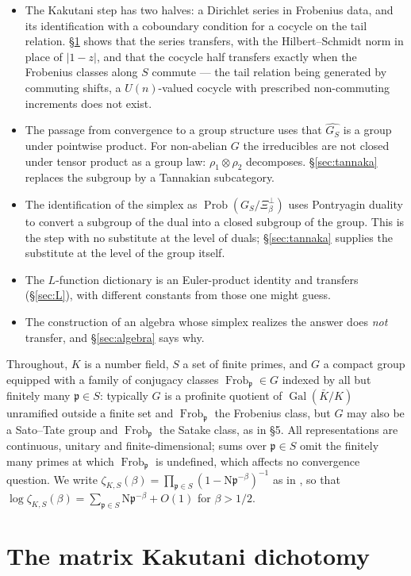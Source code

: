 \documentclass[11pt]{amsart}
\numberwithin{equation}{section}
\theoremstyle{definition}
\theoremstyle{remark}
\newcommand{\pp}{\mathfrak{p}}
\newcommand{\Ns}{\mathrm{N}}
\newcommand{\Frob}{\operatorname{Frob}}
\newcommand{\Gal}{\operatorname{Gal}}
\newcommand{\Prob}{\operatorname{Prob}}
\begin{document}
\begin{itemize}
\item[(i)] The Kakutani step has two halves: a Dirichlet series in Frobenius data, and its
identification with a coboundary condition for a cocycle on the tail relation.
\S\ref{sec:kakutani} shows that the series transfers, with the Hilbert--Schmidt norm in
place of $|1-z|$, and that the cocycle half transfers exactly when the Frobenius classes
along $S$ commute --- the tail relation being generated by commuting shifts, a
$U(n)$-valued cocycle with prescribed non-commuting increments does not exist.
\item[(ii)] The passage from convergence to a group structure uses that $\widehat{G_S}$ is a
group under pointwise product. For non-abelian $G$ the irreducibles are not closed under
tensor product as a group law: $\rho_1\otimes\rho_2$ decomposes. \S\ref{sec:tannaka} replaces
the subgroup by a Tannakian subcategory.
\item[(iii)] The identification of the simplex as $\Prob(G_S/\Xi_\beta^\perp)$ uses
Pontryagin duality to convert a subgroup of the dual into a closed subgroup of the group.
This is the step with no substitute at the level of duals; \S\ref{sec:tannaka} supplies the
substitute at the level of the group itself.
\item[(iv)] The $L$-function dictionary is an Euler-product identity and transfers
(\S\ref{sec:L}), with different constants from those one might guess.
\item[(v)] The construction of an algebra whose simplex realizes the answer does \emph{not}
transfer, and \S\ref{sec:algebra} says why.
\end{itemize}

Throughout, $K$ is a number field, $S$ a set of finite primes, and $G$ a compact group
equipped with a family of conjugacy classes $\Frob_\pp\in G$ indexed by all but finitely
many $\pp\in S$: typically $G$ is a profinite quotient of $\Gal(\bar K/K)$ unramified outside
a finite set and $\Frob_\pp$ the Frobenius class, but $G$ may also be a Sato--Tate group and
$\Frob_\pp$ the Satake class, as in \S5. All representations are continuous, unitary and
finite-dimensional; sums over $\pp\in S$ omit the finitely many primes at which
$\Frob_\pp$ is undefined, which affects no convergence question. We write
$\zeta_{K,S}(\beta)=\prod_{\pp\in S}(1-\Ns\pp^{-\beta})^{-1}$ as in \cite{Main}, so that
$\log\zeta_{K,S}(\beta)=\sum_{\pp\in S}\Ns\pp^{-\beta}+O(1)$ for $\beta>1/2$.

\section{The matrix Kakutani dichotomy}\label{sec:kakutani}
\end{document}
